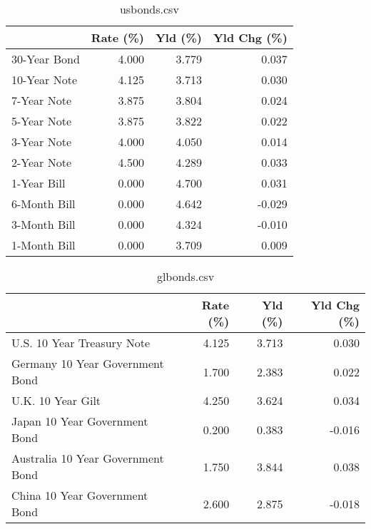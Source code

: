 \documentclass{article}%
\begin{document}
%


\begin{table}[htbp]%
\caption{usbonds.csv}%
\centering%
\begin{adjustbox}{width=1\textwidth}%
\begin{tabular}{lrrr}
\toprule
             &  Rate (\%) &  Yld (\%) &  Yld Chg (\%) \\
\midrule
30-Year Bond &     4.000 &    3.779 &        0.037 \\
10-Year Note &     4.125 &    3.713 &        0.030 \\
 7-Year Note &     3.875 &    3.804 &        0.024 \\
 5-Year Note &     3.875 &    3.822 &        0.022 \\
 3-Year Note &     4.000 &    4.050 &        0.014 \\
 2-Year Note &     4.500 &    4.289 &        0.033 \\
 1-Year Bill &     0.000 &    4.700 &        0.031 \\
6-Month Bill &     0.000 &    4.642 &       -0.029 \\
3-Month Bill &     0.000 &    4.324 &       -0.010 \\
1-Month Bill &     0.000 &    3.709 &        0.009 \\
\bottomrule
\end{tabular}
%
\end{adjustbox}%
\end{table}

%


\begin{table}[htbp]%
\caption{glbonds.csv}%
\centering%
\begin{adjustbox}{width=1\textwidth}%
\begin{tabular}{lrrr}
\toprule
                                  &  Rate (\%) &  Yld (\%) &  Yld Chg (\%) \\
\midrule
       U.S. 10 Year Treasury Note &     4.125 &    3.713 &        0.030 \\
  Germany 10 Year Government Bond &     1.700 &    2.383 &        0.022 \\
                U.K. 10 Year Gilt &     4.250 &    3.624 &        0.034 \\
    Japan 10 Year Government Bond &     0.200 &    0.383 &       -0.016 \\
Australia 10 Year Government Bond &     1.750 &    3.844 &        0.038 \\
    China 10 Year Government Bond &     2.600 &    2.875 &       -0.018 \\
\bottomrule
\end{tabular}
%
\end{adjustbox}%
\end{table}
\end{document}
